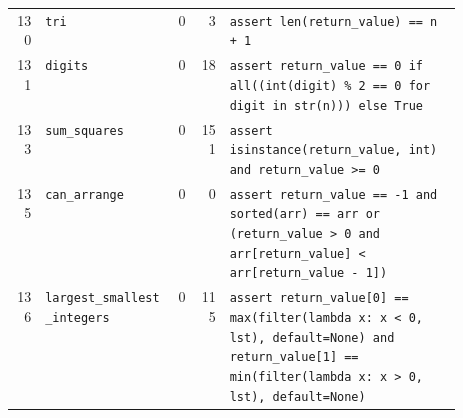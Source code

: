 \begin{footnotesize}
\begin{longtable}{@{}r l r r p{0.52\linewidth}@{}}
130 & \texttt{tri} & 0 & 3 & \texttt{assert \allowbreak{}len(\allowbreak{}return\_value)\allowbreak{} \allowbreak{}=\allowbreak{}=\allowbreak{} \allowbreak{}n \allowbreak{}+\allowbreak{} \allowbreak{}1} \\
131 & \texttt{digits} & 0 & 18 & \texttt{assert \allowbreak{}return\_value \allowbreak{}=\allowbreak{}=\allowbreak{} \allowbreak{}0 \allowbreak{}if \allowbreak{}all(\allowbreak{}(\allowbreak{}int(\allowbreak{}digit)\allowbreak{} \allowbreak{}\% \allowbreak{}2 \allowbreak{}=\allowbreak{}=\allowbreak{} \allowbreak{}0 \allowbreak{}for \allowbreak{}digit \allowbreak{}in \allowbreak{}str(\allowbreak{}n)\allowbreak{})\allowbreak{})\allowbreak{} \allowbreak{}else \allowbreak{}True} \\
133 & \texttt{sum\_squares} & 0 & 151 & \texttt{assert \allowbreak{}isinstance(\allowbreak{}return\_value,\allowbreak{} \allowbreak{}int)\allowbreak{} \allowbreak{}and \allowbreak{}return\_value \allowbreak{}>\allowbreak{}=\allowbreak{} \allowbreak{}0} \\
135 & \texttt{can\_arrange} & 0 & 0 & \texttt{assert \allowbreak{}return\_value \allowbreak{}=\allowbreak{}=\allowbreak{} \allowbreak{}-\allowbreak{}1 \allowbreak{}and \allowbreak{}sorted(\allowbreak{}arr)\allowbreak{} \allowbreak{}=\allowbreak{}=\allowbreak{} \allowbreak{}arr \allowbreak{}or \allowbreak{}(\allowbreak{}return\_value \allowbreak{}>\allowbreak{} \allowbreak{}0 \allowbreak{}and \allowbreak{}arr[\allowbreak{}return\_value]\allowbreak{} \allowbreak{}<\allowbreak{} \allowbreak{}arr[\allowbreak{}return\_value \allowbreak{}-\allowbreak{} \allowbreak{}1]\allowbreak{})\allowbreak{}} \\
136 & \texttt{largest\_smallest\_integers} & 0 & 115 & \texttt{assert \allowbreak{}return\_value[\allowbreak{}0]\allowbreak{} \allowbreak{}=\allowbreak{}=\allowbreak{} \allowbreak{}max(\allowbreak{}filter(\allowbreak{}lambda \allowbreak{}x:\allowbreak{} \allowbreak{}x \allowbreak{}<\allowbreak{} \allowbreak{}0,\allowbreak{} \allowbreak{}lst)\allowbreak{},\allowbreak{} \allowbreak{}default=\allowbreak{}None)\allowbreak{} \allowbreak{}and \allowbreak{}return\_value[\allowbreak{}1]\allowbreak{} \allowbreak{}=\allowbreak{}=\allowbreak{} \allowbreak{}min(\allowbreak{}filter(\allowbreak{}lambda \allowbreak{}x:\allowbreak{} \allowbreak{}x \allowbreak{}>\allowbreak{} \allowbreak{}0,\allowbreak{} \allowbreak{}lst)\allowbreak{},\allowbreak{} \allowbreak{}default=\allowbreak{}None)\allowbreak{}} \\

\end{longtable}
\end{footnotesize}

